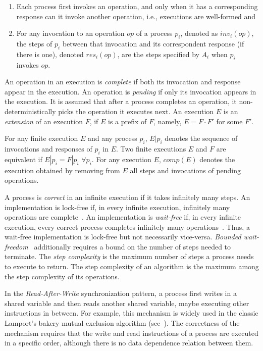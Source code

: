 \begin{enumerate}
    \item Each process first invokes an operation, and only when it has a corresponding response can it invoke another operation, i.e., executions are well-formed and
    \item For any invocation to an operation \(op\) of a process \(p_i\), denoted as \(inv_i(op)\), the steps of \(p_i\) between that invocation and its correspondent response (if there is one), denoted \(res_i(op)\), are the steps specified by \(A_i\) when \(p_i\) invokes \(op\).
\end{enumerate}

An operation in an execution is \emph{complete} if both its invocation and response appear in the execution. An operation is \emph{pending} if only its invocation appears in the execution. It is assumed that after a process completes an operation, it non-deterministically picks the operation it executes next. An execution \(E\) is an \emph{extension} of an execution \(F\), if \(E\) is a prefix of \(F\), namely, \(E = F\cdot F'\) for some \(F'\).

For any finite execution \(E\) and any process \(p_i\), \(E|p_i\) denotes the sequence of invocations and responses of \(p_i\) in \(E\). Two finite executions \(E\) and \(F\) are equivalent if \(E|p_i = F|p_i\) \(\forall p_i\). For any execution \(E\), \(comp(E)\) denotes the execution obtained by removing from \(E\) all steps and invocations of pending operations.

A process is \emph{correct} in an infinite execution if it takes infinitely many steps. An implementation is lock-free if, in every infinite execution, infinitely many operations are complete~\cite{DBLP_journals_toplas_HerlihyW90}. An implementation is \emph{wait-free} if, in every infinite execution, every correct process completes infinitely many operations~\cite {DBLP_journals_toplas_Herlihy91}. Thus, a wait-free implementation is lock-free but not necessarily vice-versa. \emph{Bounded wait-freedom}~\cite{DBLP_conf_spaa_Herlihy91} additionally requires a bound on the number of steps needed to terminate. The \emph{step complexity} is the maximum number of steps a process needs to execute to return. The step complexity of an algorithm is the maximum among the step complexity of its operations.

In the \emph{Read-After-Write} synchronization pattern, a process first writes in a shared variable and then reads another shared variable, maybe executing other instructions in between. For example, this mechanism is widely used in the classic Lamport's bakery mutual exclusion algorithm (see~\cite {DBLP_books_daglib_0020056}). The correctness of the mechanism requires that the write and read instructions of a process are executed in a specific order, although there is no data dependence relation between them.

